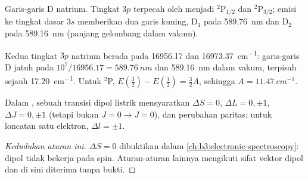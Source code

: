 \begin{omfigure}

{\small Garis-garis D natrium. Tingkat $3p$ terpecah oleh 
menjadi ${}^2$P$_{1/2}$ dan ${}^2$P$_{3/2}$; emisi ke tingkat dasar $3s$
memberikan dua garis kuning, D$_1$ pada \qty{589.76}{nm} dan D$_2$ pada
\qty{589.16}{nm} (panjang gelombang dalam vakum).}
\end{omfigure}

\begin{example}\label{ex:b3:many-electron-atoms:sodium}
Kedua tingkat $3p$ natrium berada pada 16956.17 dan \qty{16973.37}{cm^{-1}}:
garis-garis D jatuh pada $10^7/16956.17 = \qty{589.76}{nm}$ dan
\qty{589.16}{nm} dalam vakum, terpisah sejauh \qty{17.20}{cm^{-1}}. Untuk
${}^2$P, $E(\frac32) - E(\frac12) =
\frac32A$, sehingga $A = \qty{11.47}{cm^{-1}}$.
\end{example}

\begin{proposition}\label{prop:b3:many-electron-atoms:selection-atoms}
Dalam , sebuah transisi dipol listrik mensyaratkan
$\Delta S = 0$, $\Delta L = 0, \pm1$, $\Delta J = 0, \pm1$ (tetapi bukan $J = 0 \to J
= 0$), dan perubahan paritas: untuk loncatan satu elektron, $\Delta l = \pm1$.
\end{proposition}
\begin{proof}[Kedudukan aturan ini]
$\Delta S = 0$ dibuktikan dalam \cref{ch:b3:electronic-spectroscopy}: 
dipol tidak bekerja pada spin. Aturan-aturan lainnya mengikuti sifat vektor
 dipol dan di sini diterima tanpa bukti.
\end{proof}

